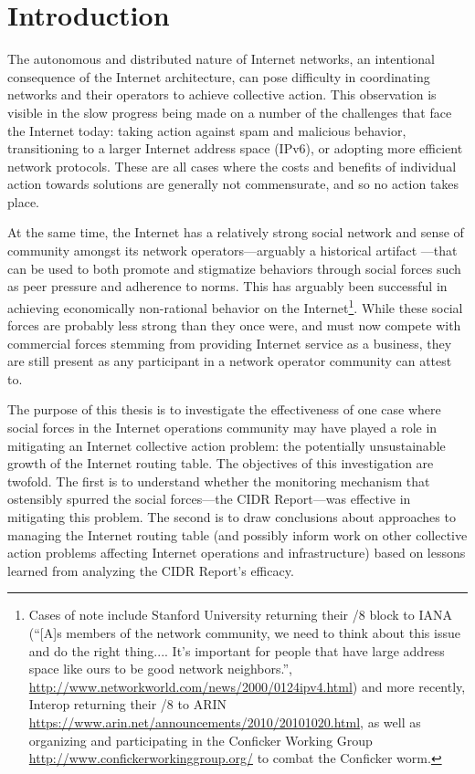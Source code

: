 \chapter{Introduction}
\label{chap:intro}

The autonomous and distributed nature of Internet networks, an intentional consequence of the Internet architecture, can pose difficulty in coordinating networks and their operators to achieve collective action. This observation is visible in the slow progress being made on a number of the challenges that face the Internet today: taking action against spam and malicious behavior, transitioning to a larger Internet address space (IPv6), or adopting more efficient network protocols. These are all cases where the costs and benefits of individual action towards solutions are generally not commensurate, and so no action takes place.

At the same time, the Internet has a relatively strong social network and sense of community amongst its network operators---arguably a historical artifact \cite{Mathew:2010ly}---that can be used to both promote and stigmatize behaviors through social forces such as peer pressure and adherence to norms. This has arguably been successful in achieving economically non-rational behavior on the Internet\footnote{Cases of note include Stanford University returning their /8 block to IANA (``[A]s members of the network community, we need to think about this issue and do the right thing.... It's important for people that have large address space like ours to be good network neighbors.'', \url{http://www.networkworld.com/news/2000/0124ipv4.html}) and more recently, Interop returning their /8 to ARIN \url{https://www.arin.net/announcements/2010/20101020.html}, as well as organizing and participating in the Conficker Working Group \url{http://www.confickerworkinggroup.org/} to combat the Conficker worm. }.
While these social forces are probably less strong than they once were, and must now compete with commercial forces stemming from providing Internet service as a business, they are still present as any participant in a network operator community can attest to.

The purpose of this thesis is to investigate the effectiveness of one case where social forces in the Internet operations community may have played a role in mitigating an Internet collective action problem: the potentially unsustainable growth of the Internet routing table. The objectives of this investigation are twofold. The first is to understand whether the monitoring mechanism that ostensibly spurred the social forces---the CIDR Report---was effective in mitigating this problem. The second is to draw conclusions about approaches to managing the Internet routing table (and possibly inform work on other collective action problems affecting Internet operations and infrastructure) based on lessons learned from analyzing the CIDR Report's efficacy.
%

